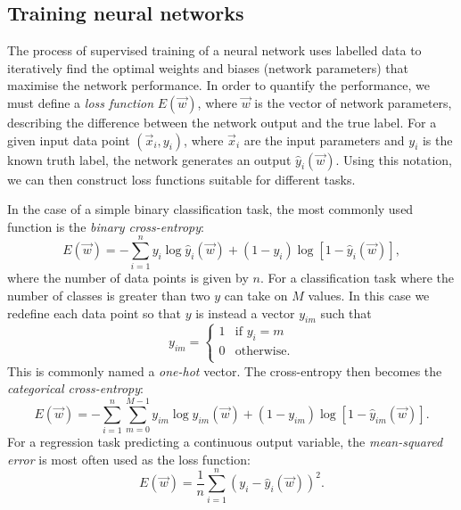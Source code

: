 \subsection{Training neural networks} %
\label{sec:cvn_theory_training} %

The process of supervised training of a neural network uses labelled data to iteratively find the
optimal weights and biases (network parameters) that maximise the network performance. In order to
quantify the performance, we must define a \emph{loss function} $E(\vec{w})$, where $\vec{w}$ is
the vector of network parameters, describing the difference between the network output and the
true label. For a given input data point $(\vec{x}_{i}, y_{i})$, where $\vec{x}_{i}$ are the input
parameters and $y_{i}$ is the known truth label, the network generates an output
$\hat{y}_{i}(\vec{w})$. Using this notation, we can then construct loss functions suitable for
different tasks.

In the case of a simple binary classification task, the most commonly used function is the
\emph{binary cross-entropy}:
\begin{equation} %
    E(\vec{w})=
    -\displaystyle\sum_{i=1}^{n}y_{i}\log\hat{y}_{i}(\vec{w})+
    (1-y_{i})\log[1-\hat{y}_{i}(\vec{w})],
    \label{eq:binary_cross_entropy}
\end{equation}
where the number of data points is given by $n$. For a classification task where the number of
classes is greater than two $y$ can take on $M$ values. In this case we redefine each data point
so that $y$ is instead a vector $y_{im}$ such that
\begin{equation} %
    y_{im}=
    \begin{cases}
        1 & \text{if $y_{i}=m$} \\
        0 & \text{otherwise.}   \\
    \end{cases}
\end{equation}
This is commonly named a \emph{one-hot} vector. The cross-entropy then becomes the
\emph{categorical cross-entropy}:
\begin{equation} %
    E(\vec{w})=
    -\displaystyle\sum_{i=1}^{n}\displaystyle\sum_{m=0}^{M-1}y_{im}\log\hat{y}_{im}
    (\vec{w})+(1-y_{im})\log[1-\hat{y}_{im}(\vec{w})].
    \label{eq:categorical_cross_entropy}
\end{equation}
For a regression task predicting a continuous output variable, the \emph{mean-squared error} is
most often used as the loss function:
\begin{equation} %
    E(\vec{w})=
    \frac{1}{n}\displaystyle\sum_{i=1}^{n}(y_{i}-
    \hat{y}_{i}(\vec{w}))^{2}.
    \label{eq:mse}
\end{equation}

